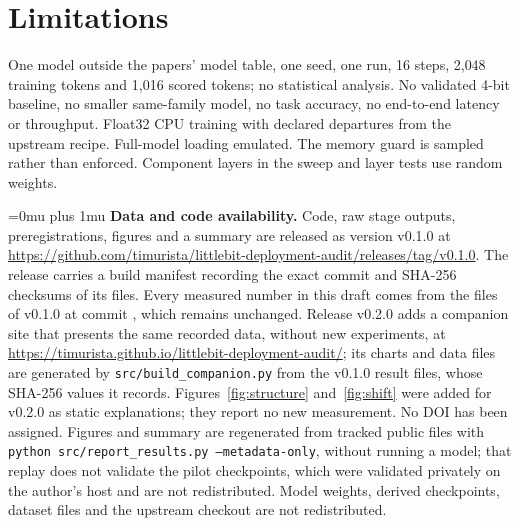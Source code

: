 \documentclass[11pt]{article}
\begin{document}
\section{Limitations}
One model outside the papers' model table, one seed, one run, 16 steps, 2{,}048 training tokens
and 1{,}016 scored tokens; no statistical analysis. No validated 4-bit baseline, no smaller
same-family model, no task accuracy, no end-to-end latency or throughput. Float32 CPU training
with declared departures from the upstream recipe. Full-model loading emulated. The memory guard
is sampled rather than enforced. Component layers in the sweep and layer tests use random weights.

\begingroup
\small
\setlength{\parskip}{0.4\baselineskip}
\def\UrlBreaks{\do\.\do\/\do\-\do\_\do\:\do\?\do\=\do\&\do\#%
  \do a\do b\do c\do d\do e\do f\do g\do h\do i\do j\do k\do l\do m%
  \do n\do o\do p\do q\do r\do s\do t\do u\do v\do w\do x\do y\do z%
  \do 0\do 1\do 2\do 3\do 4\do 5\do 6\do 7\do 8\do 9}
\Urlmuskip=0mu plus 1mu
\vspace{0.5\baselineskip}
\noindent\textbf{Data and code availability.}
Code, raw stage outputs, preregistrations, figures and a summary are released as version v0.1.0
at \url{https://github.com/timurista/littlebit-deployment-audit/releases/tag/v0.1.0}. The release
carries a build manifest recording the exact commit and SHA-256 checksums of its files. Every
measured number in this draft comes from the files of v0.1.0 at commit
, which remains unchanged. Release v0.2.0
adds a companion site that presents the same recorded data, without new experiments, at
\url{https://timurista.github.io/littlebit-deployment-audit/};
its charts and data files are generated by \texttt{src/build\_companion.py} from the v0.1.0 result
files, whose SHA-256 values it records. Figures~\ref{fig:structure} and~\ref{fig:shift} were added
for v0.2.0 as static explanations; they report no new measurement. No DOI has
been assigned. Figures and summary are regenerated from
tracked public files with \texttt{python src/report\_results.py --metadata-only}, without running
a model; that replay does not validate the pilot checkpoints, which were validated privately on
the author's host and are not redistributed. Model weights, derived checkpoints, dataset files and
the upstream checkout are not redistributed.
\end{document}
